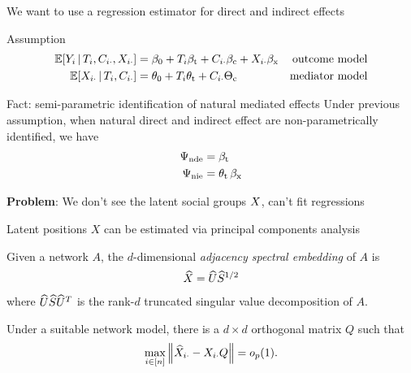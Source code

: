 \documentclass[aspectratio=169]{beamer}
\theoremstyle{remark}
\begin{document}
\begin{frame}{We want to use a regression estimator for direct and indirect effects}
    \begin{block}{Assumption}
        \begin{equation*}
            \begin{aligned}
                \E[T_i, \C_{i \cdot}, \X_{i \cdot}]{Y_i}
                 & = \betazero + T_i \betat + \C_{i \cdot} \betac + \X_{i \cdot} \betax
                 & \text{outcome model}                                                 \\
                \E[T_i, \C_{i \cdot}]{\X_{i \cdot}}
                 & = \thetazero + T_i \thetat + \C_{i \cdot} \Thetac
                 & \text{mediator model}
            \end{aligned}
        \end{equation*}
    \end{block}
    \begin{block}{Fact: semi-parametric identification of natural mediated effects}
        Under previous assumption, when natural direct and indirect effect are non-parametrically identified, we have
        \begin{equation*}
            \begin{aligned}
                \Psi_\mathrm{nde} & = \beta_\text{t}            \\
                \Psi_\mathrm{nie} & = \theta_\text{t} \, \beta_\text{x}
            \end{aligned}
        \end{equation*}
    \end{block}
    \centering
    \textbf{Problem}: We don't see the latent social groups $X$, can't fit regressions
\end{frame}

\begin{frame}{Latent positions $X$ can be estimated via principal components analysis}
    \begin{definition}[ASE]
        Given a network $A$, the $d$-dimensional \emph{adjacency spectral embedding} of $A$ is
        \begin{align*}
            \widehat{X} = \widehat{U} \widehat{S}^{1/2}
        \end{align*}
        \noindent where $\widehat{U} \widehat{S} \widehat{U}^T$ is the rank-$d$ truncated singular value decomposition of $A$.
    \end{definition}
    \begin{lemma}
        Under a suitable network model, there is a $d \times d$ orthogonal matrix $Q$ such that
        \begin{equation*}
            \max_{i \in [n]} \, \norm*{\Xhat_{i \cdot} - \X_{i \cdot} Q} = \op{1}.
        \end{equation*}
    \end{lemma}
\end{frame}
\end{document}
